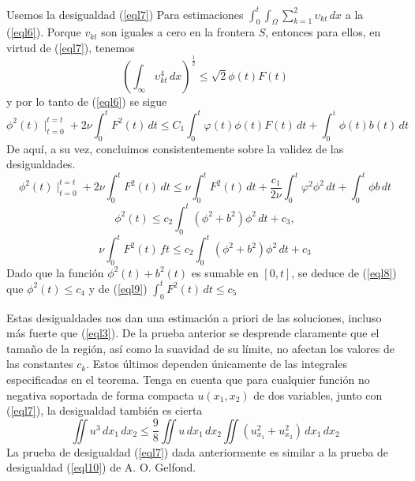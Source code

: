 Usemos la desigualdad (\ref{eql7}) Para estimaciones $\int_0^t\int_{\Omega}\sum_{k = 1}^2 \upsilon_{kt}\,dx$ a la (\ref{eql6}). Porque $v_{kt}$ son iguales a cero en la frontera $S$, entonces para ellos, en virtud de (\ref{eql7}), tenemos
\begin{equation*}
    \left(\int_{\infty} \upsilon_{kt}^4\,dx \right)^{\frac{1}{2}} \leq \sqrt{2}\phi(t)F(t)
\end{equation*}
y por lo tanto de (\ref{eql6}) se sigue
\begin{equation*}
    \phi^2(t)\mid_{t = 0}^{t = t} + 2 \nu\int_0^t F^2(t)\,dt \leq C_1\int_0^t \varphi(t) \phi(t) F(t)\,dt + \int_0^i \phi(t)b(t)\,dt
\end{equation*}
De aquí, a su vez, concluimos consistentemente sobre la validez de las desigualdades.
\begin{equation*}
    \phi^2(t)\mid_{t = 0}^{t = t} + 2 \nu\int_0^t F^2(t)\,dt \leq \nu\int_0^t F^2(t)\,dt + \frac{c_1}{2\nu}\int_0^t \varphi^2\phi^2\,dt + \int_0^t\phi b\,dt
\end{equation*}
\begin{equation}
    \phi^2(t)\leq c_2\int_0^t \left(\phi^2 + b^2\right)\phi^2\,dt + c_3,
    \label{eql8}
\end{equation}
\begin{equation}
    \nu \int_0^tF^2(t)\,ft\leq c_2\int_0^t\left(\phi^2 + b^2\right)\phi^2\,dt + c_3
    \label{eql9}
\end{equation}
Dado que la función $\phi^2(t) + b^2(t)$ es sumable en $[0, t]$, se deduce de (\ref{eql8}) que $\phi^2(t)\leq c_4$ y de (\ref{eql9}) $\int_0^t F^2(t)\,dt\leq c_5$

Estas desigualdades nos dan una estimación a priori de las soluciones, incluso más fuerte que (\ref{eql3}). De la prueba anterior se desprende claramente que el tamaño de la región, así como la suavidad de su límite, no afectan los valores de las constantes $c_k$. Estos últimos dependen únicamente de las integrales especificadas en el teorema.
Tenga en cuenta que para cualquier función no negativa soportada de forma compacta $u(x_1,x_2)$ de dos variables, junto con (\ref{eql7}), la desigualdad también es cierta
\begin{equation}
    \iint u^3\,dx_1\,dx_2 \leq \frac{9}{8} \iint u\,dx_1\,dx_2 \iint \left(u_{x_1}^2 + u_{x_2}^2 \right)\,dx_1\,dx_2
    \label{eql10}
\end{equation}
La prueba de desigualdad (\ref{eql7}) dada anteriormente es similar a la prueba de desigualdad (\ref{eql10}) de A. O. Gelfond.
\newpage
